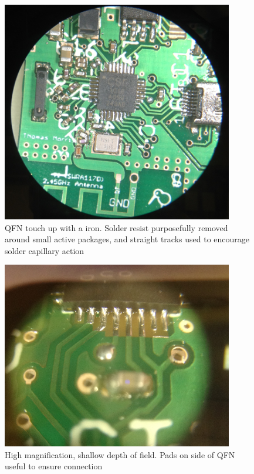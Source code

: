 \documentclass[]{article}
\begin{document}
\begin{figure}[htb]
	\begin{center}
		\includegraphics[width = 0.9\textwidth]{center}
	\end{center}
	\caption{\ac{QFN} touch up with a iron. Solder resist purposefully removed around small active packages, and straight tracks used to encourage solder capillary action}
	\label{fig:center}
\end{figure} 

\begin{figure}[htb]
	\begin{center}
		\includegraphics[width = 0.9\textwidth]{side}
	\end{center}
	\caption{High magnification, shallow depth of field. Pads on side of \ac{QFN} useful to ensure connection}
	\label{fig:side}
\end{figure} 
\end{document}
